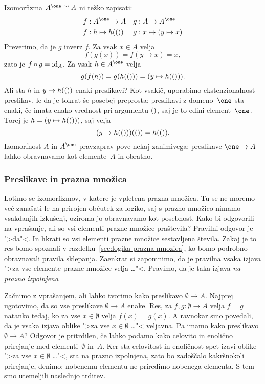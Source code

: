 Izomorfizma $A^\one \cong A$ ni težko zapisati:
%
\begin{align*}
  f &: A^\one \to A &
  g &: A \to A^\one \\
  f &: h \mapsto h(\unit) &
  g &: x \mapsto (y \mapsto x)
\end{align*}
%
Preverimo, da je $g$ inverz $f$. Za vsak $x \in A$ velja
%
\begin{equation*}
  f(g(x)) = f(y \mapsto x) = x,
\end{equation*}
%
zato je $f \circ g = \id[A]$. Za vsak $h \in A^\one$ velja
%
\begin{equation*}
  g(f(h)) = g(h(\unit)) = (y \mapsto h(\unit)).
\end{equation*}
%
Ali sta $h$ in $y \mapsto h(\unit)$ enaki preslikavi? Kot vsakič, uporabimo
ekstenzionalnost preslikav, le da je tokrat še posebej preprosta: preslikavi z
domeno~$\one$ sta enaki, če imata enako vrednost pri argumentu $\unit$, saj je to edini
element~$\one$. Torej je $h = (y \mapsto h(\unit))$, saj velja
%
\begin{equation*}
  (y \mapsto h(\unit))(\unit) = h(\unit).
\end{equation*}
%
Izomorfnost $A$ in $A^\one$ pravzaprav pove nekaj zanimivega: preslikave $\one \to A$
lahko obravnavamo kot elemente~$A$ in obratno.


\subsubsection{Preslikave in prazna množica}
\label{sec:presl-prazna-mnozica}

Lotimo se izomorfizmov, v katere je vpletena prazna množica. Tu se ne moremo več zanašati
le na prirojen občutek za logiko, saj s prazno množico nimamo vsakdanjih izkušenj, oziroma
jo obravnavamo kot posebnost. Kako bi odgovorili na vprašanje, ali so vsi elementi prazne
množice praštevila? Pravilni odgovor je ">da"<. In hkrati so vsi elementi prazne množice
sestavljena števila. Zakaj je to res bomo spoznali v
razdelku~\ref{sec:logika-prazna-mnozica}, ko bomo podrobno obravnavali pravila sklepanja.
Zaenkrat si zapomnimo, da je pravilna vsaka izjava ">za vse elemente prazne množice velja
\dots"<. Pravimo, da je taka izjava \emph{na prazno izpolnjena}

Začnimo z vprašanjem, ali lahko tvorimo kako preslikavo $\emptyset \to A$. Najprej
ugotovimo, da so vse preslikave $\emptyset \to A$ enake. Res, za $f, g : \emptyset \to A$
velja $f = g$ natanko tedaj, ko za vse $x \in \emptyset$ velja $f(x) = g(x)$. A ravnokar
smo povedali, da je vsaka izjava oblike ">za vse $x \in \emptyset$ \dots"< veljavna. Pa
imamo kako preslikavo $\emptyset \to A$? Odgovor je pritrdilen, če lahko podamo kako
celovito in enolično prirejanje med elementi~$\emptyset$ in~$A$. Ker sta celovitost in
enoličnost spet izavi oblike ">za vse $x \in \emptyset$ \dots"<, sta na prazno izpolnjena,
zato bo zadoščalo kakršnokoli prirejanje, denimo: nobenemu elementu ne priredimo nobenega
elementa. S tem smo utemeljili naslednjo trditev.

